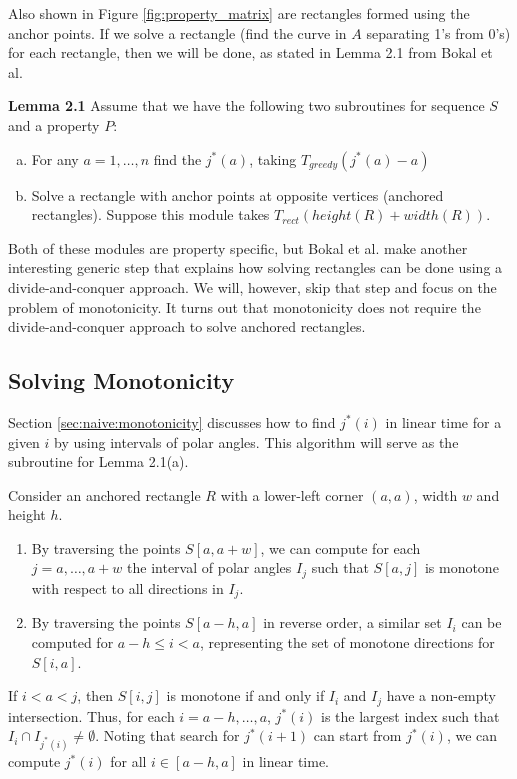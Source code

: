 \documentclass{article}
\begin{document}
Also shown in Figure \ref{fig:property_matrix} are rectangles formed using the anchor points. If we solve a rectangle (find the curve in $A$ separating 1's from 0's) for each rectangle, then we will be done, as stated in Lemma 2.1 from Bokal et al.

\textbf{Lemma 2.1} Assume that we have the following two subroutines for sequence $S$ and a property $P$:
\begin{enumerate}[(a)]
    \item For any $a = 1, \dots, n$ find the $j^*(a)$, taking $T_{greedy}(j^*(a) - a)$
    \item Solve a rectangle with anchor points at opposite vertices (anchored rectangles). Suppose this module takes $T_{rect}(height(R) + width(R))$.
\end{enumerate}

Both of these modules are property specific, but Bokal et al. make another interesting generic step that explains how solving rectangles can be done using a divide-and-conquer approach. We will, however, skip that step and focus on the problem of monotonicity. It turns out that monotonicity does not require the divide-and-conquer approach to solve anchored rectangles.

\subsection{Solving Monotonicity}
Section \ref{sec:naive:monotonicity} discusses how to find $j^*(i)$ in linear time for a given $i$ by using intervals of polar angles. This algorithm will serve as the subroutine for Lemma 2.1(a).

Consider an anchored rectangle $R$ with a lower-left corner $(a, a)$, width $w$ and height $h$.
\begin{enumerate}[-]
\item By traversing the points $S[a, a + w]$, we can compute for each $j = a, \dots, a + w$ the interval of polar angles $I_j$ such that $S[a, j]$ is monotone with respect to all directions in $I_j$.
\item By traversing the points $S[a - h, a]$ in reverse order, a similar set $I_i$ can be computed for $a - h \leq i < a$, representing the set of monotone directions for $S[i, a]$.
\end{enumerate}

If $i < a < j$, then $S[i, j]$ is monotone if and only
if $I_i$ and $I_j$ have a non-empty intersection. Thus, for each
$i = a - h, \dots, a$, $j^*(i)$ is the largest index such that $I_i
\cap I_{j^*(i)} \neq \emptyset$.
Noting that search for $j^*(i+1)$
can start from $j^*(i)$, we can compute $j^*(i)$ for all $i \in [a
- h, a]$ in linear time.
\end{document}
